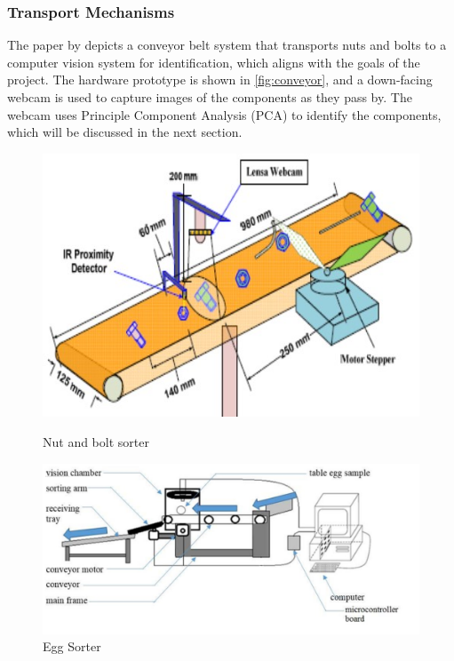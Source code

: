 \subsubsection{Transport Mechanisms}
The paper by \citet{Dhenge2013MechanicalNS} depicts a conveyor belt system that transports nuts and bolts to a computer vision system for identification, which aligns with the goals of the project. The hardware prototype is shown in \autoref{fig:conveyor}, and a down-facing webcam is used to capture images of the components as they pass by. The webcam uses Principle Component Analysis (PCA) to identify the components, which will be discussed in the next section.

\begin{figure}[H]
  \hfill
  \begin{minipage}[t]{0.45\textwidth}
    \centering
    \includegraphics[width=\textwidth]{imgs/articles/conveyor.jpg}
    \caption{Nut and bolt sorter \cite{Dhenge2013MechanicalNS}}
    \label{fig:conveyor}
  \end{minipage}
  \hfill
  \begin{minipage}[t]{0.45\textwidth}
    \centering
    \includegraphics[width=\textwidth]{imgs/articles/eggsorter.jpg}
    \caption{Egg Sorter \cite{eggsorting}}
    \label{fig:eggsorter}
  \end{minipage}
  \hfill
\end{figure}


